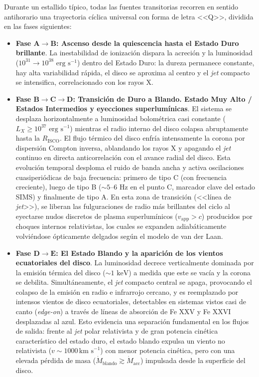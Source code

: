 Durante un estallido típico, todas las fuentes transitorias recorren en sentido antihorario una trayectoria cíclica universal con forma de letra <<Q>>, dividida en las fases siguientes:
\begin{itemize}
    \item[$\bullet$] \textbf{Fase $\mathbf{A\to B}$: Ascenso desde la quiescencia hasta el Estado Duro brillante}. La inestabilidad de ionización dispara la acreción y la luminosidad ($10^{31} \to 10^{38}\mbox{ erg s}^{-1}$) dentro del Estado Duro: la dureza permanece constante, hay alta variabilidad rápida, el disco se aproxima al centro y el \textit{jet} compacto se intensifica, correlacionado con los rayos X.
    \item[$\bullet$] \textbf{Fase $\mathbf{B\to C\to D}$: Transición de Duro a Blando. Estado Muy Alto / Estados Intermedios y eyecciones superlumínicas}. El sistema se desplaza horizontalmente a luminosidad bolométrica casi constante ($L_X \geq 10^{37}\mbox{ erg s}^{-1}$) mientras el radio interno del disco colapsa abruptamente hasta la $R_{\mbox{ISCO}}$. El flujo térmico del disco enfría intensamente la corona por dispersión Compton inversa, ablandando los rayos X y apagando el \textit{jet} continuo en directa anticorrelación con el avance radial del disco. Esta evolución temporal desploma el ruido de banda ancha y activa oscilaciones cuasiperiódicas de baja frecuencia: primero de tipo C (con frecuencia creciente), luego de tipo B ($\sim 5\mbox{--}6\mbox{ Hz}$ en el punto C, marcador clave del estado SIMS) y finalmente de tipo A. En esta zona de transición (<<línea de \textit{jet}>>), se liberan las fulguraciones de radio más brillantes del ciclo al eyectarse nudos discretos de plasma superlumínicos ($v_{\mbox{app}} > c$) producidos por choques internos relativistas, los cuales se expanden adiabáticamente volviéndose ópticamente delgados según el modelo de van der Laan.
    \item[$\bullet$] \textbf{Fase $\mathbf{D\to E}$: El Estado Blando y la aparición de los vientos ecuatoriales del disco}. La luminosidad decrece verticalmente dominada por la emisión térmica del disco ($\sim 1\mbox{ keV}$) a medida que este se vacía y la corona se debilita. Simultáneamente, el \textit{jet} compacto central se apaga, provocando el colapso de la emisión en radio e infrarrojo cercano, y es reemplazado por intensos vientos de disco ecuatoriales, detectables en sistemas vistos casi de canto (\textit{edge-on}) a través de líneas de absorción de Fe XXV y Fe XXVI desplazadas al azul. Esto evidencia una separación fundamental en los flujos de salida: frente al \textit{jet} polar relativista y de gran potencia cinética característico del estado duro, el estado blando expulsa un viento no relativista ($v \sim 1000\,\mbox{km s}^{-1}$) con menor potencia cinética, pero con una elevada pérdida de masa ($\dot{M}_{\mbox{blando}} \gtrsim \dot{M}_{\mbox{acc}}$) impulsada desde la superficie del disco.

\end{itemize}
